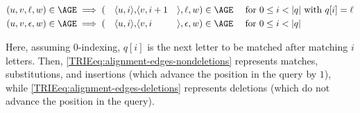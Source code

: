 

\vspace{-1.2em}
{%
\small
\begin{alignat}{10}
	(u,v,\ell,w) &\in \AGE \implies (&\langle u, i \rangle, &\langle v, i+1
		&&\rangle,\ell,w) \in \AGE \quad \text{ for } 0 \leq i < |q| \text{ with }
		q[i]=\ell \label{TRIEeq:alignment-edges-nondeletions} \\
	(u,v,\epsilon,w) &\in\AGE \implies (&\langle u, i \rangle, &\langle v, i
		&&\rangle,\epsilon,w) \in \AGE \quad \text{ for } 0 \leq i < |q| \label{TRIEeq:alignment-edges-deletions}
\end{alignat}
}%

Here, assuming $0$-indexing, $q[i]$ is the next letter to be matched after
matching $i$ letters. Then, \cref{TRIEeq:alignment-edges-nondeletions} represents
matches, substitutions, and insertions (which advance the position in the query
by $1$), while \cref{TRIEeq:alignment-edges-deletions} represents deletions (which do
not advance the position in the query).